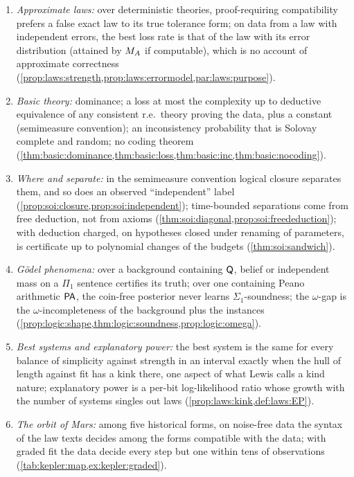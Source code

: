 \begin{enumerate}[leftmargin=*,label=(\arabic*)]
\item \emph{Approximate laws:} over deterministic theories, proof-requiring compatibility prefers a false exact law to its true tolerance form; on data from a law with independent errors, the best loss rate is that of the law with its error distribution (attained by $M_{A}$ if computable), which is no account of approximate correctness (\cref{prop:laws:strength,prop:laws:errormodel,par:laws:purpose}).
\item \emph{Basic theory:} dominance; a loss at most the complexity up to deductive equivalence of any consistent r.e.\ theory proving the data, plus a constant (semimeasure convention); an inconsistency probability that is Solovay complete and random; no coding theorem (\cref{thm:basic:dominance,thm:basic:loss,thm:basic:inc,thm:basic:nocoding}).
\item \emph{Where \SAIabbr and \SOIabbr separate:} in the semimeasure convention logical closure separates them, and so does an observed ``independent'' label (\cref{prop:soi:closure,prop:soi:independent}); time-bounded separations come from free deduction, not from axioms (\cref{thm:soi:diagonal,prop:soi:freededuction}); with deduction charged, on hypotheses closed under renaming of parameters, \SAIabbr is certificate \SOIabbr up to polynomial changes of the budgets (\cref{thm:soi:sandwich}).
\item \emph{G\"odel phenomena:} over a background containing $\mathsf{Q}$, belief or independent mass on a $\Pi_1$ sentence certifies its truth; over one containing Peano arithmetic $\mathsf{PA}$, the coin-free posterior never learns $\Sigma_1$-soundness; the $\omega$-gap is the $\omega$-incompleteness of the background plus the instances (\cref{prop:logic:shape,thm:logic:soundness,prop:logic:omega}).
\item \emph{Best systems and explanatory power:} the best system is the same for every balance of simplicity against strength in an interval exactly when the hull of length against fit has a kink there, one aspect of what Lewis calls a kind nature; explanatory power is a per-bit log-likelihood ratio whose growth with the number of systems singles out laws (\cref{prop:laws:kink,def:laws:EP}).
\item \emph{The orbit of Mars:} among five historical forms, on noise-free data the syntax of the law texts decides among the forms compatible with the data; with graded fit the data decide every step but one within tens of observations (\cref{tab:kepler:map,ex:kepler:graded}).
\end{enumerate}

